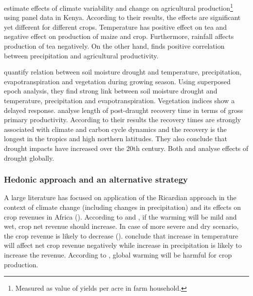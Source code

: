 \documentclass[a4paper,12pt]{article}
\begin{document}
\cite{Ochieng2016} estimate effects of climate variability and change on agricultural production\footnote{Measured as value of yields per acre in farm household.} using panel data in Kenya. According to their results, the effects are significant yet different for different crops. Temperature has positive effect on tea and negative effect on production of maize and crop. Furthermore, rainfall affects production of tea negatively. On the other hand, \cite{Vrieling2011} finds positive correlation between precipitation and agricultural productivity.








 \cite{nicolai2017} quantify relation between soil moisture drought and temperature, precipitation, evapotranspiration and vegetation during growing season. Using superposed epoch analysis, they find strong link between soil moisture drought and temperature, precipitation and evapotranspiration. Vegetation indices show a delayed response. \cite{schwalm2017} analyse length of post-draught recovery time in terms of gross primary productivity. According to their results the recovery times are strongly associated with climate and carbon cycle dynamics and the recovery is the longest in the tropics and high northern latitudes. They also conclude that drought impacts have increased over the 20th century. Both \cite{nicolai2017} and \cite{schwalm2017} analyse effects of drought globally.
 

\subsubsection*{Hedonic approach and an alternative strategy}

A large literature has focused on application of the Ricardian approach in the context of climate change (including changes in precipitation) and its effects on crop revenues in Africa (\citealp{RicardianBello,kabubo2007, KMendelsohn2008, SeoMendelsohn}). According to \cite{SeoMendelsohn} and \cite{KMendelsohn2008}, if the warming will be mild and wet, crop net revenue should increase. In case of more severe and dry scenario, the crop revenue is likely to decrease (\citealp{KMendelsohn2008, SeoMendelsohn}).  \cite{RicardianBello} conclude that increase in temperature will affect net crop revenue negatively while increase in precipitation is likely to increase the revenue. According to \citet{kabubo2007}, global warming will be harmful for crop production.
\end{document}
